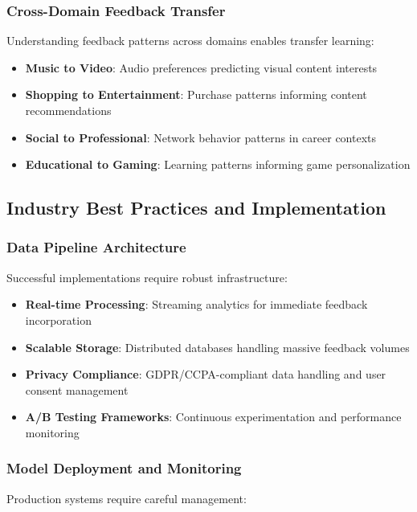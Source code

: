 \documentclass[acmsmall,review,anonymous]{acmart}
\begin{document}
\subsubsection{Cross-Domain Feedback Transfer}

Understanding feedback patterns across domains enables transfer learning:

\begin{itemize}
    \item \textbf{Music to Video}: Audio preferences predicting visual content interests
    \item \textbf{Shopping to Entertainment}: Purchase patterns informing content recommendations
    \item \textbf{Social to Professional}: Network behavior patterns in career contexts
    \item \textbf{Educational to Gaming}: Learning patterns informing game personalization
\end{itemize}

\subsection{Industry Best Practices and Implementation}

\subsubsection{Data Pipeline Architecture}

Successful implementations require robust infrastructure:

\begin{itemize}
    \item \textbf{Real-time Processing}: Streaming analytics for immediate feedback incorporation
    \item \textbf{Scalable Storage}: Distributed databases handling massive feedback volumes
    \item \textbf{Privacy Compliance}: GDPR/CCPA-compliant data handling and user consent management
    \item \textbf{A/B Testing Frameworks}: Continuous experimentation and performance monitoring
\end{itemize}

\subsubsection{Model Deployment and Monitoring}

Production systems require careful management:
\end{document}
